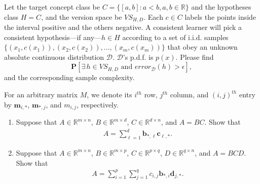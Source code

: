 \documentclass[11pt,letter,notitlepage]{article}
\begin{document}
\begin{solution}

\end{solution}

\newpage

\begin{exercise} 
	Let the target concept class be $C=\{[a,b]:a<b, a,b\in\mathbb{R}\}$ and the hypotheses class $H=C$, and the version space be $VS_{H,D}$. Each $c\in C$ labels the points inside the interval positive and the others negative. A consistent learner will pick a consistent hypothesis---if any---$h\in H$ according to a set of i.i.d. samples $\{(x_1,c(x_1)),(x_2,c(x_2)),\ldots,(x_m,c(x_m))\}$ that obey an unknown absolute continuous distribution $\mathcal{D}$. $\mathcal{D}$'s p.d.f. is $p(x)$. Please find 
	$$\mathbf{P}[\exists\, h\in VS_{H,D} \mbox{ and } error_{\mathcal{D}}(h)>\epsilon],$$
	and the corresponding sample complexity.
\end{exercise}


\begin{solution}

\end{solution}

\newpage

\begin{exercise}
    For an arbitrary matrix $M$, we denote its $i^{th}$ row, $j^{th}$ column, and $(i,j)^{th}$ entry by $\mathbf{m}_{i,*}$, $\mathbf{m}_{*,j}$, and $m_{i,j}$, respectively.
    \begin{enumerate}
        \item Suppose that $A\in\mathbb{R}^{m\times n}$, $B\in\mathbb{R}^{m\times d}$, $C\in\mathbb{R}^{d\times n}$, and $A=BC$. Show that
            \begin{align*}
                A=\sum_{\ell=1}^d\mathbf{b}_{*,\ell}\mathbf{c}_{\ell,*}.
            \end{align*}
        
        \item Suppose that $A\in\mathbb{R}^{m\times n}$, $B\in\mathbb{R}^{m\times p}$, $C\in\mathbb{R}^{p\times q}$, $D\in\mathbb{R}^{q\times n}$, and $A=BCD$. Show that
            \begin{align*}
                A=\sum_{i=1}^p\sum_{j=1}^qc_{i,j}\mathbf{b}_{*,i}\mathbf{d}_{j,*}.
            \end{align*}
    \end{enumerate}
\end{exercise}
\end{document}
